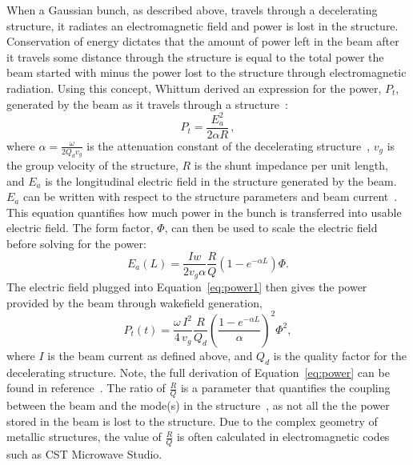 When a Gaussian bunch, as described above, travels through a 
decelerating structure, it radiates an electromagnetic field and 
power is lost in the structure. Conservation of energy dictates 
that the amount of power left in the beam 
after it travels some distance through the structure is equal to 
the total power the beam started with
minus the power lost to the structure through electromagnetic radiation. 
Using this concept, Whittum derived an expression for the power, $P_t$, 
generated by the beam as it travels through a structure~\cite{Whittum}: 
\begin{equation}
P_t = \frac{E^2_a}{2 \alpha R}\, ,
\label{eq:power1}
\end{equation} 
where $\alpha=\frac{\omega}{2Q_{d}v_{g}}$ is the attenuation constant of the 
decelerating structure~\cite{CLICdesignReport, Whittum}, 
$v_g$ is the group velocity of the structure, $R$ is the shunt impedance
per unit length, and $E_a$ is the longitudinal electric field in the structure
generated by the beam. 
$E_a$ can be written with respect to 
the structure parameters and beam current~\cite{PETSeq}. 
This equation quantifies how much power in the bunch is transferred into usable electric field.
The form factor, $\Phi$, can then be used to scale the electric field before 
solving for the power: 
\begin{equation}
E_a\left(L\right) = \frac{Iw}{2 v_g \alpha} \frac{R}{Q} \left(1-e^{-\alpha L}\right) \Phi.
\end{equation}
The electric field plugged into Equation~\ref{eq:power1} then gives the power provided
by the beam through wakefield generation,
\begin{equation}
P_{t}(t)=\frac{\omega\,I^{2}}{4\,v_{g}}\frac{R}{Q_d}\left(\frac{1-e^{-\alpha L}}{\alpha}\right)^2\Phi^{2},
\label{eq:power}
\end{equation}
where $I$ is the beam current as defined above, and $Q_{d}$ is the quality factor for the decelerating
structure. Note, the full derivation of Equation~\ref{eq:power} can be found in reference~\cite{PETSeq}. 
The ratio of $\frac{R}{Q}$ is a parameter that quantifies the coupling between
the beam and the mode(s) in the structure~\cite{Whittum}, as not all the the power stored in 
the beam is lost to the structure. Due to the complex geometry of metallic structures,
the value of $\frac{R}{Q}$ is often calculated in electromagnetic codes such
as CST Microwave Studio. 

